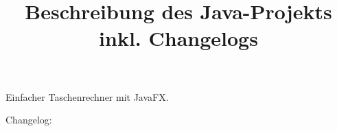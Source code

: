 \documentclass[a4wide,11pt]{article}
\title{Beschreibung des Java-Projekts inkl. Changelogs}
\begin{document}
Einfacher Taschenrechner mit JavaFX.

Changelog:
\end{document}
